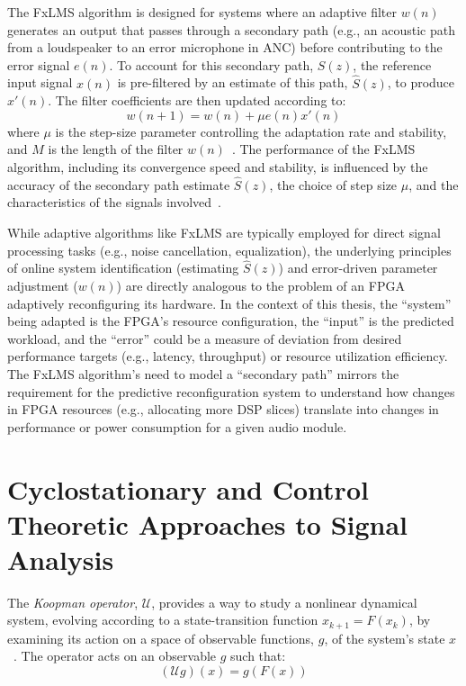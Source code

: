 The FxLMS algorithm is designed for systems where an adaptive filter $w(n)$ generates an output that passes through a secondary path (e.g., an acoustic path from a loudspeaker to an error microphone in ANC) before contributing to the error signal $e(n)$. To account for this secondary path, $S(z)$, the reference input signal $x(n)$ is pre-filtered by an estimate of this path, $\hat{S}(z)$, to produce $x'(n)$. The filter coefficients are then updated according to:
\[
w(n+1) = w(n) + \mu e(n) x'(n)
\]
where $\mu$ is the step-size parameter controlling the adaptation rate and stability, and $M$ is the length of the filter $w(n)$~\cite{ref9}. The performance of the FxLMS algorithm, including its convergence speed and stability, is influenced by the accuracy of the secondary path estimate $\hat{S}(z)$, the choice of step size $\mu$, and the characteristics of the signals involved~\cite{ref9}.

While adaptive algorithms like FxLMS are typically employed for direct signal processing tasks (e.g., noise cancellation, equalization), the underlying principles of online system identification (estimating $\hat{S}(z)$) and error-driven parameter adjustment ($w(n)$) are directly analogous to the problem of an FPGA adaptively reconfiguring its hardware. In the context of this thesis, the ``system'' being adapted is the FPGA's resource configuration, the ``input'' is the predicted workload, and the ``error'' could be a measure of deviation from desired performance targets (e.g., latency, throughput) or resource utilization efficiency. The FxLMS algorithm's need to model a ``secondary path'' mirrors the requirement for the predictive reconfiguration system to understand how changes in FPGA resources (e.g., allocating more DSP slices) translate into changes in performance or power consumption for a given audio module.

\section{Cyclostationary and Control Theoretic Approaches to Signal Analysis}

The \emph{Koopman operator}, $\mathcal{U}$, provides a way to study a nonlinear dynamical system, evolving according to a state-transition function $x_{k+1} = F(x_k)$, by examining its action on a space of observable functions, $g$, of the system's state $x$~\cite{Koopman1931,Mezic2005}. The operator acts on an observable $g$ such that:
\[
(\mathcal{U}g)(x) = g(F(x))
\]

